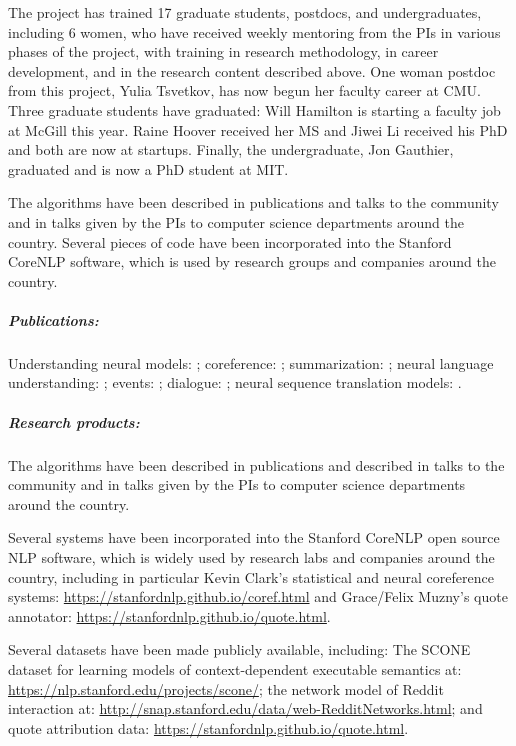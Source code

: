 \documentclass{article}
\begin{document}
The project has trained 17 graduate students, postdocs, and undergraduates, including 6 women, who have received weekly mentoring from the PIs in various phases of the project, with training in research methodology, in career development, and in the research content described above. One woman postdoc from this project, Yulia Tsvetkov, has now begun her faculty career at CMU. Three graduate students have graduated: Will Hamilton is starting a faculty job at McGill this year. Raine Hoover received her MS and Jiwei Li received his PhD and both are now at startups. Finally, the undergraduate, Jon Gauthier, graduated and is now a PhD student at MIT.

The algorithms have been described in publications and talks to the community and in talks given by the PIs to computer science departments around the country. Several pieces of code have been incorporated into the Stanford CoreNLP software, which is used by research groups and companies around the country.



\subparagraph{Publications:} Understanding neural models: \cite{li2015tree,khandelwal2018lm}; coreference: \cite{clark2016deep,clark2016improving}; summarization: \cite{see2016compression}; neural language understanding: \cite{bowman2016spinn,hamilton2016cultural,hamilton2016diachronic}; events: \cite{huang2016events}; dialogue: \cite{li2017adversarial,muzny2017twostage,guu2017bridging}; neural sequence translation models: \cite{luong2016acl_hybrid,wuebker2016acl}.


\subparagraph{Research products:}

The algorithms have been described in publications and described in talks to the community and in talks given by the PIs to computer science departments around the country.

 Several systems have been incorporated into the Stanford CoreNLP open source NLP software, which is widely used by research labs and companies around the country, including in particular Kevin Clark's statistical and neural coreference systems: \url{https://stanfordnlp.github.io/coref.html} and Grace/Felix Muzny's quote annotator: \url{https://stanfordnlp.github.io/quote.html}.

Several datasets have been made publicly available, including: The SCONE dataset for learning models of context-dependent executable semantics at: \url{https://nlp.stanford.edu/projects/scone/}; the network model of Reddit interaction at: \url{http://snap.stanford.edu/data/web-RedditNetworks.html}; and quote attribution data: \url{https://stanfordnlp.github.io/quote.html}.



\end{document}
